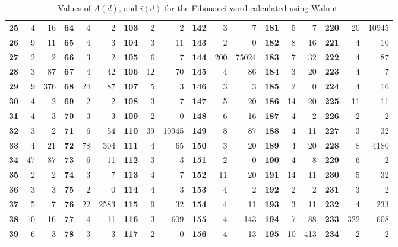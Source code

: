 \documentclass[10pt,a4paper,reqno]{amsart}
\newcommand{\walnut}{{\ttfamily Walnut}}
\begin{document}
\begin{table}[ht]
{{\begin{tabular}{|r|r|r||r|r|r||r|r|r||r|r|r||r|r|r||r|r|r|}
    \bf{25} & 4     & 16    & \bf{64} & 4     & 2     & \bf{103} & 2     & 2     & \bf{142} & 3     & 7     & \bf{181} & 5     & 7     &\bf{220} & 20    & 10945  \\
    \bf{26} & 9     & 11    & \bf{65} & 4     & 3     & \bf{104} & 3     & 11    & \bf{143} & 2     & 0     & \bf{182} & 8     & 16    & \bf{221} & 4     & 10  \\
    \bf{27} & 2     & 2     & \bf{66} & 3     & 2     & \bf{105} & 6     & 7     & \bf{144} & 200   & 75024 & \bf{183} & 7     & 32    & \bf{222} & 4     & 87 \\
    \bf{28} & 3     & 87    & \bf{67} & 4     & 42    & \bf{106} & 12    & 70    & \bf{145} & 4     & 86    & \bf{184} & 3     & 20    &  \bf{223} & 4 & 7\\
    \bf{29} & 9     & 376   & \bf{68} & 24    & 87    & \bf{107} & 5     & 3     & \bf{146} & 3     & 3     & \bf{185} & 2     & 0     & \bf{224} & 4     & 16\\
    \bf{30} & 4     & 2     & \bf{69} & 2     & 2     & \bf{108} & 3     & 7     & \bf{147} & 5     & 20    & \bf{186} & 14    & 20    & \bf{225} & 11    & 11 \\
    \bf{31} & 4     & 3     & \bf{70} & 3     & 3     & \bf{109} & 2     & 0     & \bf{148} & 6     & 16    & \bf{187} & 4     & 2     & \bf{226} & 2     & 2\\
    \bf{32} & 3     & 2     & \bf{71} & 6     & 54    & \bf{110} & 39 & 10945 & \bf{149} & 8     & 87    & \bf{188} & 4     & 11    &  \bf{227} & 3 & 32\\
    \bf{33} & 4     & 21    & \bf{72} & 78    & 304   & \bf{111} & 4     & 65    & \bf{150} & 3     & 20    & \bf{189} & 4     & 20    & \bf{228} & 8     & 4180\\
    \bf{34} & 47    & 87    & \bf{73} & 6     & 11    & \bf{112} & 3     & 3     & \bf{151} & 2     & 0     & \bf{190} & 4     & 8     &  \bf{229} & 6 & 2 \\
    \bf{35} & 2     & 2     & \bf{74} & 3     & 7     & \bf{113} & 4     & 7     & \bf{152} & 11    & 20    & \bf{191} & 14    & 11    & \bf{230} & 5 & 32\\
    \bf{36} & 3     & 3     & \bf{75} & 2     & 0     & \bf{114} & 4     & 3     & \bf{153} & 4     & 2     & \bf{192} & 2     & 2     &   \bf{231} & 3     & 2\\
    \bf{37} & 5     & 7     & \bf{76} & 22    & 2583  & \bf{115} & 9     & 32    & \bf{154} & 4     & 11    & \bf{193} & 3     & 11    & \bf{232} & 4     & 233\\
    \bf{38} & 10    & 16    & \bf{77} & 4     & 11    & \bf{116} & 3     & 609   & \bf{155} & 4     & 143   & \bf{194} & 7     & 88  & \bf{233} & 322     & 608\\
    \bf{39} & 6     & 3     & \bf{78} & 3     & 3     & \bf{117} & 2     & 0     & \bf{156} & 4     & 13    & \bf{195} & 10    & 413   & \bf{234} & 2     & 2\\
    \hline
\end{tabular}
}
}
\caption{Values of $A(d)$, and $i(d)$ for the Fibonacci word calculated using \walnut{}.}
\label{tab:fibdadid}
\end{table}
\end{document}
